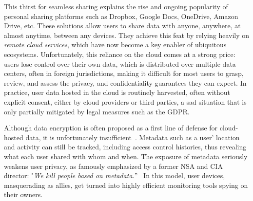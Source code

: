 This thirst for seamless sharing explains the rise and ongoing popularity
of personal sharing platforms such as Dropbox, Google Docs,
OneDrive, Amazon Drive, etc. These solutions allow users to share data with anyone, anywhere, at almost
anytime, between any devices. They achieve this feat by relying heavily on
\emph{remote cloud services}, which have now become a key enabler of ubiquitous ecosystems. 
Unfortunately, this reliance on the cloud comes at a strong price: 
users lose control over their own data, which is distributed over
multiple data centers, often in foreign jurisdictions, making it difficult for most users to grasp, review, and assess the privacy, and
confidentiality guarantees they can expect. In practice, user data hosted in the cloud is routinely harvested, often without explicit
consent, either by cloud providers or third parties, a sad situation that is only partially
mitigated by legal measures such as the GDPR.

Although data encryption is often proposed as a first line of defense for cloud-hosted data, it is unfortunately  insufficient~\cite{granick_2017, HooffLZZ15, HarnikPS10}. Metadata such as a user'
location and activity can still be tracked, including access
control histories, thus revealing what each user shared with whom and when. 
The exposure of metadata seriously weakens user privacy, as famously emphasized by a former NSA and CIA director: "\emph{We kill people based on metadata.}''~\cite{NaughtonTheGuardian2016} 
In this model, user devices, masquerading as allies, get turned into %
highly efficient monitoring tools spying on their owners. 

